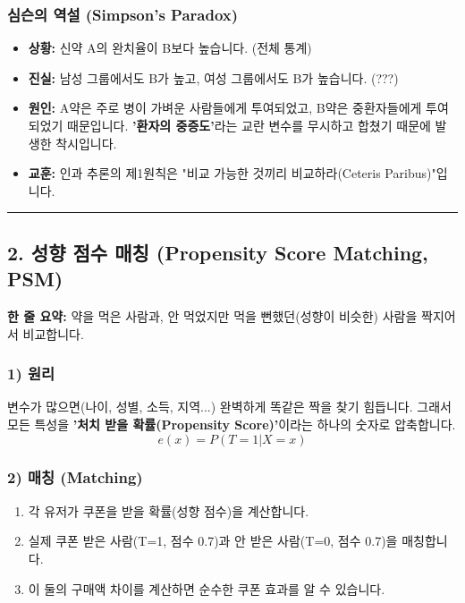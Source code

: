 \documentclass[11pt,a4paper]{book}
\theoremstyle{definition}
\begin{document}
\subsubsection*{심슨의 역설 (Simpson's Paradox)}
\begin{itemize}
    \item \textbf{상황:} 신약 A의 완치율이 B보다 높습니다. (전체 통계)
    \item \textbf{진실:} 남성 그룹에서도 B가 높고, 여성 그룹에서도 B가 높습니다. (???)
    \item \textbf{원인:} A약은 주로 병이 가벼운 사람들에게 투여되었고, B약은 중환자들에게 투여되었기 때문입니다. \textbf{'환자의 중증도'}라는 교란 변수를 무시하고 합쳤기 때문에 발생한 착시입니다.
    \item \textbf{교훈:} 인과 추론의 제1원칙은 "비교 가능한 것끼리 비교하라(Ceteris Paribus)"입니다.
\end{itemize}

\vspace{0.5cm}\hrule\vspace{0.5cm}

\subsection{2. 성향 점수 매칭 (Propensity Score Matching, PSM)}


\begin{conceptbox}[title={개념 2: 도플갱어 찾기}]
\textbf{한 줄 요약:} 약을 먹은 사람과, 안 먹었지만 먹을 뻔했던(성향이 비슷한) 사람을 짝지어서 비교합니다.
\end{conceptbox}

\subsubsection*{1) 원리}
변수가 많으면(나이, 성별, 소득, 지역...) 완벽하게 똑같은 짝을 찾기 힘듭니다. 그래서 모든 특성을 \textbf{'처치 받을 확률(Propensity Score)'}이라는 하나의 숫자로 압축합니다.
$$ e(x) = P(T=1 | X=x) $$

\subsubsection*{2) 매칭 (Matching)}
\begin{enumerate}
    \item 각 유저가 쿠폰을 받을 확률(성향 점수)을 계산합니다.
    \item 실제 쿠폰 받은 사람(T=1, 점수 0.7)과 안 받은 사람(T=0, 점수 0.7)을 매칭합니다.
    \item 이 둘의 구매액 차이를 계산하면 순수한 쿠폰 효과를 알 수 있습니다.
\end{enumerate}
\end{document}
